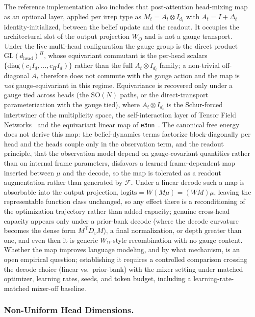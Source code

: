 \documentclass[twoside,11pt]{article}
\begin{document}
The reference implementation also includes that post-attention head-mixing map as an optional layer, applied per irrep type as $M_t = A_t \otimes I_{d_t}$ with $A_t = I + \Delta_t$ identity-initialized, between the belief update and the readout. It occupies the architectural slot of the output projection $W_O$ and is not a gauge transport. Under the live multi-head configuration the gauge group is the direct product $\mathrm{GL}(d_{\mathrm{head}})^H$, whose equivariant commutant is the per-head scalars $\{\mathrm{diag}(c_1 I_{d}, \dots, c_H I_{d})\}$ rather than the full $A_t \otimes I_{d_t}$ family; a non-trivial off-diagonal $A_t$ therefore does not commute with the gauge action and the map is \emph{not} gauge-equivariant in this regime. Equivariance is recovered only under a gauge tied across heads (the $\mathrm{SO}(N)$ paths, or the direct-transport parameterization with the gauge tied), where $A_t \otimes I_{d_t}$ is the Schur-forced intertwiner of the multiplicity space, the self-interaction layer of Tensor Field Networks~\citep{thomas2018tensor} and the equivariant linear map of \texttt{e3nn}~\citep{geiger2022e3nn}. The canonical free energy does not derive this map: the belief-dynamics terms factorize block-diagonally per head and the heads couple only in the observation term, and the readout principle, that the observation model depend on gauge-covariant quantities rather than on internal frame parameters, disfavors a learned frame-dependent map inserted between $\mu$ and the decode, so the map is tolerated as a readout augmentation rather than generated by $\mathcal{F}$. Under a linear decode such a map is absorbable into the output projection, $\mathrm{logits} = W(M\mu) = (WM)\mu$, leaving the representable function class unchanged, so any effect there is a reconditioning of the optimization trajectory rather than added capacity; genuine cross-head capacity appears only under a prior-bank decode (where the decode curvature becomes the dense form $M^{\mathsf T} D_v M$), a final normalization, or depth greater than one, and even then it is generic $W_O$-style recombination with no gauge content. Whether the map improves language modeling, and by what mechanism, is an open empirical question; establishing it requires a controlled comparison crossing the decode choice (linear vs.\ prior-bank) with the mixer setting under matched optimizer, learning rates, seeds, and token budget, including a learning-rate-matched mixer-off baseline.

\subsubsection{Non-Uniform Head Dimensions.}
\end{document}
